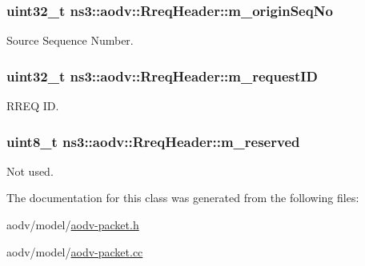\subsubsection[{\texorpdfstring{m\+\_\+origin\+Seq\+No}{m_originSeqNo}}]{\setlength{\rightskip}{0pt plus 5cm}uint32\+\_\+t ns3\+::aodv\+::\+Rreq\+Header\+::m\+\_\+origin\+Seq\+No\hspace{0.3cm}{\ttfamily [private]}}\hypertarget{classns3_1_1aodv_1_1RreqHeader_a0d80d0807dc4a17d937e9b48ee19d684}{}\label{classns3_1_1aodv_1_1RreqHeader_a0d80d0807dc4a17d937e9b48ee19d684}


Source Sequence Number. 

\subsubsection[{\texorpdfstring{m\+\_\+request\+ID}{m_requestID}}]{\setlength{\rightskip}{0pt plus 5cm}uint32\+\_\+t ns3\+::aodv\+::\+Rreq\+Header\+::m\+\_\+request\+ID\hspace{0.3cm}{\ttfamily [private]}}\hypertarget{classns3_1_1aodv_1_1RreqHeader_a85fb153f906e68086a9a7b30ace0cc6e}{}\label{classns3_1_1aodv_1_1RreqHeader_a85fb153f906e68086a9a7b30ace0cc6e}


R\+R\+EQ ID. 

\subsubsection[{\texorpdfstring{m\+\_\+reserved}{m_reserved}}]{\setlength{\rightskip}{0pt plus 5cm}uint8\+\_\+t ns3\+::aodv\+::\+Rreq\+Header\+::m\+\_\+reserved\hspace{0.3cm}{\ttfamily [private]}}\hypertarget{classns3_1_1aodv_1_1RreqHeader_ac00eed4b5b9ac451c341fe383dd70d68}{}\label{classns3_1_1aodv_1_1RreqHeader_ac00eed4b5b9ac451c341fe383dd70d68}


Not used. 



The documentation for this class was generated from the following files\+:\begin{DoxyCompactItemize}
\item 
aodv/model/\hyperlink{aodv-packet_8h}{aodv-\/packet.\+h}\item 
aodv/model/\hyperlink{aodv-packet_8cc}{aodv-\/packet.\+cc}\end{DoxyCompactItemize}
